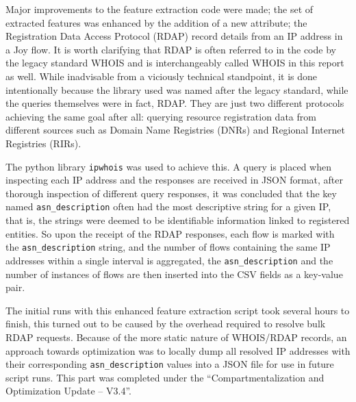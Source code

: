 \documentclass{article}
\begin{document}
Major improvements to the feature extraction code were made; the set of
extracted features was enhanced by the addition of a new
attribute; the Registration Data Access Protocol (RDAP) record details
from an IP address in a Joy flow. It is worth clarifying that RDAP is
often referred to in the code by the legacy standard WHOIS and is
interchangeably called WHOIS in this report as well. While inadvisable
from a viciously technical standpoint, it is done intentionally because
the library used was named after the legacy standard, while the queries themselves were in fact, RDAP. They are just two different protocols achieving the same goal after all: querying resource registration data from different sources such as Domain Name Registries (DNRs) and Regional Internet Registries (RIRs).\newline

The python library \texttt{ipwhois} was used to achieve this. A query is placed
when inspecting each IP address and the responses are received in JSON
format, after thorough inspection of different query responses, it was
concluded that the key named \texttt{asn\_description} often had the most
descriptive string for a given IP, that is, the strings were deemed to
be identifiable information linked to registered entities. So upon the
receipt of the RDAP responses, each flow is marked with the
\texttt{asn\_description} string, and the number of flows containing the same
IP addresses within a single interval is aggregated, the
\texttt{asn\_description} and the number of instances of flows are then
inserted into the CSV fields as a key-value pair.\newline

The initial runs with this enhanced feature extraction script took
several hours to finish, this turned out to be caused by the overhead
required to resolve bulk RDAP requests. Because of the more static
nature of WHOIS/RDAP records, an approach towards optimization was to
locally dump all resolved IP addresses with their corresponding
\texttt{asn\_description} values into a JSON file for use in future script
runs. This part was completed under the ``Compartmentalization and
Optimization Update -- V3.4''.
\end{document}
